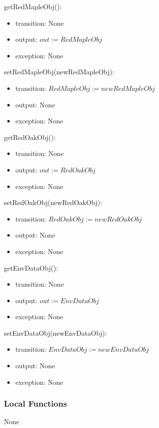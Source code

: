 \documentclass[12pt, titlepage]{article}
\begin{document}
\renewcommand{\attr}{RedMapleObj}
\noindent get\attr():
\begin{itemize}
\item transition: None
\item output: $\mathit{out := \attr}$
\item exception: None
\end{itemize}

\noindent set\attr(new\attr):
\begin{itemize}
\item transition: $\mathit{\attr := new\attr}$
\item output: None
\item exception: None
\end{itemize}


\renewcommand{\attr}{RedOakObj}
\noindent get\attr():
\begin{itemize}
\item transition: None
\item output: $\mathit{out := \attr}$
\item exception: None
\end{itemize}

\noindent set\attr(new\attr):
\begin{itemize}
\item transition: $\mathit{\attr := new\attr}$
\item output: None
\item exception: None
\end{itemize}


\renewcommand{\attr}{EnvDataObj}
\noindent get\attr():
\begin{itemize}
\item transition: None
\item output: $\mathit{out := \attr}$
\item exception: None
\end{itemize}

\noindent set\attr(new\attr):
\begin{itemize}
\item transition: $\mathit{\attr := new\attr}$
\item output: None
\item exception: None
\end{itemize}


\subsubsection{Local Functions}
None
\end{document}
